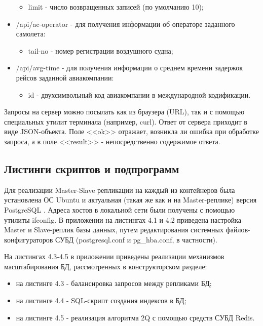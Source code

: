 \begin{itemize}
\begin{itemize}
		\item limit - число возвращенных записей (по умолчанию 10);
	\end{itemize}
	\item /api/ac-operator - для получения информации об операторе заданного самолета:
	\begin{itemize}
		\item  tail-no - номер регистрации воздушного судна;
	\end{itemize}
	\item /api/avg-time - для получения информации о среднем времени задержок рейсов заданной авиакомпании:
	\begin{itemize}
		\item  id - двухсимвольный код авиакомпании в международной кодификации.
	\end{itemize}
\end{itemize}

Запросы на сервер можно посылать как из браузера (URL), так и с помощью специальных утилит терминала (например, curl). Ответ от сервера приходит в виде JSON-объекта. Поле <<ok>> отражает, возникла ли ошибка при обработке запроса, а в поле <<result>> - непосредственно содержимое ответа.


\subsection{Листинги скриптов и подпрограмм}

Для реализации Master-Slave репликации на каждый из контейнеров была установлена ОС Ubuntu \cite{ubuntu} и актуальная (такая же как и на Master-реплике) версия PostgreSQL \cite{postgres}. Адреса хостов в локальной сети были получены с помощью утилиты ifconfig. В приложении на листингах 4.1 и 4.2 приведена настройка Master и Slave-реплик базы данных, путем редактирования системных файлов-конфигураторов СУБД (postgresql.conf и pg\_hba.conf, в частности). 

На листингах 4.3-4.5 в приложении приведены реализации механизмов масштабирования БД, рассмотренных в конструкторском разделе:
\begin{itemize}
	\item на листинге 4.3 - балансировка запросов между репликами БД;
	\item на листинге 4.4 - SQL-скрипт создания индексов в БД;
	\item на листинге 4.5 - реализация алгоритма 2Q с помощью средств СУБД Redis.
\end{itemize}

